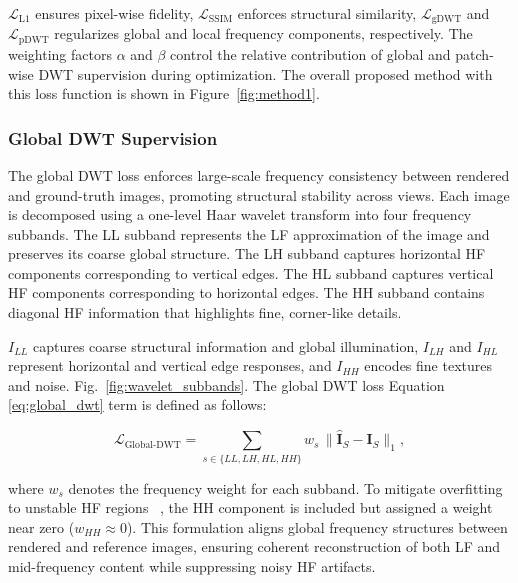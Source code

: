 \noindent $\mathcal{L}_{\text{L1}}$ ensures pixel-wise fidelity, $\mathcal{L}_{\text{SSIM}}$ enforces structural similarity, $\mathcal{L}_{\text{gDWT}}$ and $\mathcal{L}_{\text{pDWT}}$ regularizes global and local frequency components, respectively. 
The weighting factors $\alpha$ and $\beta$ control the relative contribution of global and patch-wise DWT supervision during optimization. The overall proposed method with this loss function is shown in  Figure~\ref{fig:method1}.

\subsubsection{Global DWT Supervision}

The global DWT loss enforces large-scale frequency consistency between rendered and ground-truth images, promoting structural stability across views.  
Each image is decomposed using a one-level Haar wavelet transform into four frequency subbands. The LL subband represents the LF approximation of the image and preserves its coarse global structure. The LH subband captures horizontal HF components corresponding to vertical edges. The HL subband captures vertical HF components corresponding to horizontal edges. The HH subband contains diagonal HF information that highlights fine, corner-like details.


 $I_{LL}$ captures coarse structural information and global illumination, 
$I_{LH}$ and $I_{HL}$ represent horizontal and vertical edge responses, and $I_{HH}$ encodes fine textures and noise. Fig.~\ref{fig:wavelet_subbands}. The global DWT loss Equation \ref{eq:global_dwt} term is defined as follows:

\begin{equation}
\mathcal{L}_{\text{Global-DWT}} =
\sum_{s \in \{LL, LH, HL, HH\}}
w_s \, \|\widehat{\mathbf{I}}_{S} - \mathbf{I}_{S}\|_1,
\label{eq:global_dwt}
\end{equation}

where $w_s$ denotes the frequency weight for each subband.  
To mitigate overfitting to unstable HF regions ~\cite{yang2023freenerf}, the HH component is included but assigned a weight near zero ($w_{HH} \!\approx\! 0$).  
This formulation aligns global frequency structures between rendered and reference images, ensuring coherent reconstruction of both LF and mid-frequency content while suppressing noisy HF artifacts.

